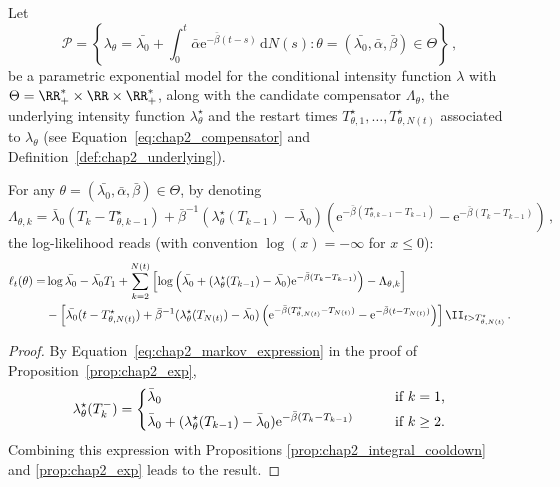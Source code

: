 \begin{corollary}
  Let
  \begin{equation}
    \mathcal P = \left\{ \lambda_\theta = \bar{\lambda_0} + \int_{0}^{t}{\bar \alpha \mathrm{e}^{-\bar \beta(t-s)}\,\mathrm{d}N(s)} : \theta=(\bar{\lambda_0}, \bar \alpha, \bar \beta) \in \Theta \right\}\,,
    \label{eq:chap2_model}
  \end{equation}
  be a parametric exponential model for the conditional intensity function $\lambda$ with $\Theta = \RR_+^* \times \RR \times \RR_+^*$,
  along with the candidate compensator $\Lambda_\theta$, the underlying intensity function $\lambda_\theta^\star$ and the restart times $T_{\theta, 1}^\star,\ldots, T_{\theta, N(t)}^\star$ associated to $\lambda_\theta$ (see Equation~\eqref{eq:chap2_compensator} and Definition~\ref{def:chap2_underlying}). %

  For any $\theta=(\bar{\lambda_0}, \bar \alpha, \bar \beta) \in \Theta$, by denoting
  \[
    \Lambda_{\theta, k} =
    \bar \lambda_0(T_k - T_{\theta, k-1}^\star) + \bar \beta^{-1} (\lambda_\theta^\star(T_{k-1}) - \bar \lambda_0) (\mathrm{e}^{-\bar \beta(T_{\theta, k-1}^\star-T_{k-1})}-\mathrm{e}^{-\bar \beta(T_k-T_{k-1})})\,,
  \]
  the log-likelihood reads (with convention $\log(x) = -\infty$ for $x \leq 0$):
  \begin{align}
      \ell_t(\theta)
      =& \log{\bar{\lambda_0}}
      - \bar{\lambda_0} T_1
      + \sum_{k=2}^{N(t)} \left[ \log \left(\bar{\lambda_0} + (\lambda_\theta^\star(T_{k-1}) - \bar{\lambda_0}) \mathrm{e}^{-\bar \beta(T_{k}-T_{k-1})} \right) - \Lambda_{\theta, k} \right] \notag\\
      &- \left[ \bar{\lambda_0} (t - T_{\theta, N(t)}^\star) + \bar \beta^{-1} (\lambda_\theta^\star(T_{N(t)}) - \bar{\lambda_0}) \left(\mathrm{e}^{-\bar \beta(T_{\theta, N(t)}^\star-T_{N(t)})}-\mathrm{e}^{-\bar \beta(t-T_{N(t)})} \right) \right] \II_{t > T_{\theta, N(t)}^\star}
      \label{eq:chap2_likeli_exp}\,.
  \end{align}
  \label{cor:chap2_loglik}
\end{corollary}
\begin{proof}
  By Equation~\eqref{eq:chap2_markov_expression} in the proof of Proposition~\ref{prop:chap2_exp},
  \begin{equation*}
  \lambda_\theta^\star(T_k^-) =
  \begin{dcases}
      \bar \lambda_0 &\text{\qquad if $k = 1$,}\\
      \bar \lambda_0 + (\lambda_\theta^\star(T_{k-1}) - \bar \lambda_0) \mathrm{e}^{-\bar \beta(T_{k}-T_{k-1})} &\text{\qquad if $k\geq2$.}
  \end{dcases}
\end{equation*}
Combining this expression with Propositions \ref{prop:chap2_integral_cooldown} and \ref{prop:chap2_exp} leads to the result.
\end{proof}

